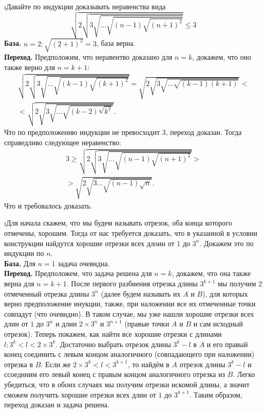 \i Давайте по индукции доказывать неравенства вида
$$\sqrt{2\sqrt{3\sqrt{ \ldots \sqrt{(n-1)\sqrt{(n+1)^2}}}}} \leq 3$$
\textbf{База.} $n = 2: \sqrt{(2+1)^2} = 3$, база верна.\\
\textbf{Переход.} Предположим, что неравентво доказано для $n=k$, докажем, что оно также верно для $n=k+1:$
\begin{gather*}
    \sqrt{2\sqrt{3\sqrt{ \ldots \sqrt{(k-1)\sqrt{(k+1)^2}}}}} = \sqrt{2\sqrt{3\sqrt{ \ldots \sqrt{(k-1)(k+1)}}}} <\\
    < \sqrt{2\sqrt{3\sqrt{ \ldots \sqrt{(k-2)\sqrt{k^2}}}}}.
\end{gather*}    
Что по предположению индукции не превосходит $3$, переход доказан. Тогда справедливо следующее неравенство:
\begin{gather*}
    3 \geqslant \sqrt{2\sqrt{3\sqrt{ \ldots \sqrt{(n-1)\sqrt{(n+1)^2}}}}} > \\
    > \sqrt{2\sqrt{3 \ldots \sqrt{(n-1)\sqrt{n}}}}.
\end{gather*}
Что и требовалось доказать. 

\i Для начала скажем, что мы будем называть отрезок, оба конца которого отмечены, хорошим. Тогда от нас требуется доказать, что в указанной в условии конструкции найдутся хорошие отрезки всех длоин от $1$ до $3^n$. Докажем это по индукции по $n$.\\
\textbf{База.} Для $n = 1$ задача очевидна.\\
\textbf{Переход.} Предположем, что задача решена для $n=k$, докажем, что она также верна для $n=k+1$. После первого разбиения отрезка длины $3^{k+1}$ мы получим 2 отмеченный отрезка длины $3^n$ (далее будем называть их $A$ и $B$), для которых верно предположение инукции, также, при наложении все их отмеченные точки совпадут (что очевидно). В таком случае, мы уже нашли хорошие отрезки всех длин от $1$ до $3^n$ и длин $2\times3^n$ и $3^{n+1}$ (правые точки $A$ и $B$ и сам исходный отрезок). Теперь покажем, как найти все хорошие отрезки с длинами $l: 3^k < l < 2 \times 3^k$. Достаточно выбрать отрезок длины $3^{k} - l$ в $A$ и его правый конец соединить с левым концом аналогичного (совпадающего при наложении) отрезка в $B$. Если же $2\times3^k < l < 3^{k+1}$, то найдём в $A$ отрезок длины $3^k - l$ и ссоединим его левый конец с правым концом аналогичного отрезка из $B$. Легко убедиться, что в обоих случаях мы получим отрезки искомой длины, а значит сможем получить хорошие отрезки всех длин от $1$ до $3^{k+1}$. Таким образом, переход доказан и задача решена.

